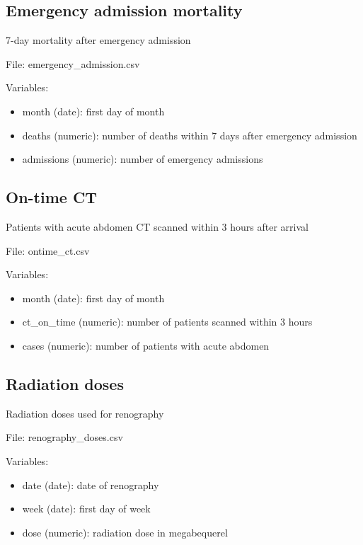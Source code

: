 \documentclass[
]{book}
\providecommand{\tightlist}{%
  \setlength{\itemsep}{0pt}\setlength{\parskip}{0pt}}
\begin{document}
\subsection*{Emergency admission mortality}\label{emergency-admission-mortality}

7-day mortality after emergency admission

File: emergency\_admission.csv

Variables:

\begin{itemize}
\tightlist
\item
  month (date): first day of month
\item
  deaths (numeric): number of deaths within 7 days after emergency admission
\item
  admissions (numeric): number of emergency admissions
\end{itemize}

\subsection*{On-time CT}\label{on-time-ct}

Patients with acute abdomen CT scanned within 3 hours after arrival

File: ontime\_ct.csv

Variables:

\begin{itemize}
\tightlist
\item
  month (date): first day of month
\item
  ct\_on\_time (numeric): number of patients scanned within 3 hours
\item
  cases (numeric): number of patients with acute abdomen
\end{itemize}

\subsection*{Radiation doses}\label{radiation-doses}

Radiation doses used for renography

File: renography\_doses.csv

Variables:

\begin{itemize}
\tightlist
\item
  date (date): date of renography
\item
  week (date): first day of week
\item
  dose (numeric): radiation dose in megabequerel
\end{itemize}
\end{document}
